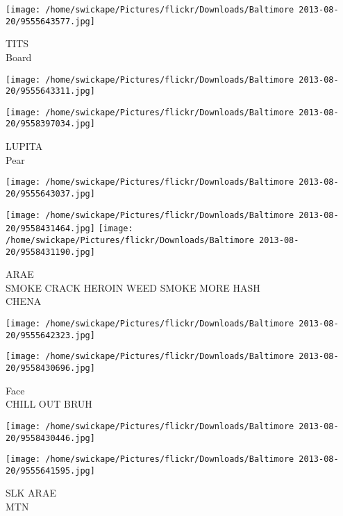 \documentclass[10pt,letterpaper]{article}
\begin{document}
\vspace{0.25in}
\texttt{[image: /home/swickape/Pictures/flickr/Downloads/Baltimore 2013-08-20/9555643577.jpg]}

TITS\\
Board\\
\pagebreak

\texttt{[image: /home/swickape/Pictures/flickr/Downloads/Baltimore 2013-08-20/9555643311.jpg]}

\vspace{0.25in}
\texttt{[image: /home/swickape/Pictures/flickr/Downloads/Baltimore 2013-08-20/9558397034.jpg]}

LUPITA\\
Pear\\
\pagebreak

\texttt{[image: /home/swickape/Pictures/flickr/Downloads/Baltimore 2013-08-20/9555643037.jpg]}

\vspace{0.25in}
\texttt{[image: /home/swickape/Pictures/flickr/Downloads/Baltimore 2013-08-20/9558431464.jpg]}
\texttt{[image: /home/swickape/Pictures/flickr/Downloads/Baltimore 2013-08-20/9558431190.jpg]}

ARAE\\
SMOKE CRACK HEROIN WEED SMOKE MORE HASH\\
CHENA\\
\pagebreak

\texttt{[image: /home/swickape/Pictures/flickr/Downloads/Baltimore 2013-08-20/9555642323.jpg]}

\vspace{0.25in}
\texttt{[image: /home/swickape/Pictures/flickr/Downloads/Baltimore 2013-08-20/9558430696.jpg]}

Face\\
CHILL OUT BRUH\\
\pagebreak

\texttt{[image: /home/swickape/Pictures/flickr/Downloads/Baltimore 2013-08-20/9558430446.jpg]}

\vspace{0.25in}
\texttt{[image: /home/swickape/Pictures/flickr/Downloads/Baltimore 2013-08-20/9555641595.jpg]}

SLK ARAE\\
MTN\\
\pagebreak
\end{document}
